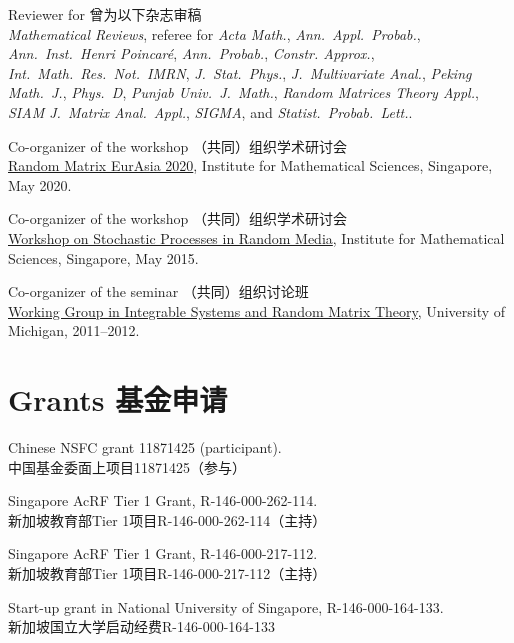 \documentclass[12pt,a4paper]{article}
\newenvironment{item_list}{
 \begin{list}{}{
   \setlength{\leftmargin}{1.5em}
   \setlength{\itemsep}{0.25em}
   \setlength{\parskip}{0pt}
   \setlength{\parsep}{0.25em}
 }
}{
 \end{list}
}
\begin{document}
\begin{item_list}
\item Reviewer for 曾为以下杂志审稿 \\
  \textit{Mathematical Reviews}, referee for \textit{Acta Math.}, \textit{Ann.\ Appl.\ Probab.}, \textit{Ann.\ Inst.\ Henri Poincar\'{e}}, \textit{Ann.\ Probab.}, \textit{Constr. Approx.}, \textit{Int.\ Math.\ Res.\ Not.\ IMRN}, \textit{J.\ Stat.\ Phys.}, \textit{J.\ Multivariate Anal.}, \textit{Peking Math.\ J.}, \textit{Phys.\ D}, \textit{Punjab Univ.\ J.\ Math.}, \textit{Random Matrices Theory Appl.}, \textit{SIAM J.\ Matrix Anal.\ Appl.}, \textit{SIGMA}, and \textit{Statist.\ Probab.\ Lett.}.
\item Co-organizer of the workshop （共同）组织学术研讨会 \\
  \href{https://ims.nus.edu.sg/events/2020/random/index.php}{Random Matrix EurAsia 2020}, Institute for Mathematical Sciences, Singapore, May 2020.
\item Co-organizer of the workshop （共同）组织学术研讨会 \\
  \href{http://www2.ims.nus.edu.sg/Programs/015wrandom/index.php}{Workshop on Stochastic Processes in Random Media}, Institute for Mathematical Sciences, Singapore, May 2015.
\item Co-organizer of the seminar （共同）组织讨论班 \\
  \href{http://www.math.lsa.umich.edu/seminars_events/events.php?eventdefid=43&dt_begin=2011-07-01&dt_end=2011-12-31}
  {Working Group in Integrable Systems and Random Matrix Theory}, University of Michigan, 2011--2012.
\end{item_list}

\section*{Grants 基金申请}

\begin{item_list}
\item 
  Chinese NSFC grant 11871425 (participant). \\
  中国基金委面上项目11871425（参与）
\item
  Singapore AcRF Tier 1 Grant, R-146-000-262-114. \\
  新加坡教育部Tier 1项目R-146-000-262-114（主持）
\item
  Singapore AcRF Tier 1 Grant, R-146-000-217-112. \\
  新加坡教育部Tier 1项目R-146-000-217-112（主持）
\item
  Start-up grant in National University of Singapore, R-146-000-164-133. \\
  新加坡国立大学启动经费R-146-000-164-133
\end{item_list}
\end{document}
